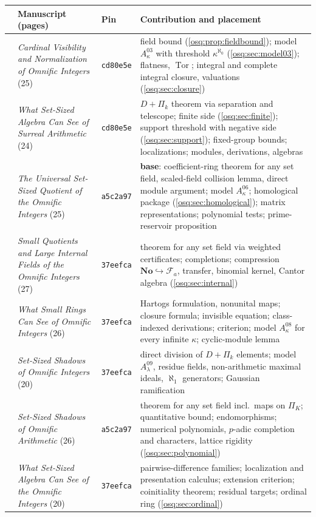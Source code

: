 \documentclass[11pt,letterpaper]{article}
\numberwithin{equation}{section}
\theoremstyle{definition}
\theoremstyle{remark}
\theoremstyle{plain}
\newcommand{\No}{\mathbf{No}}
\newcommand{\FF}{\mathscr F}         %
\newcommand{\Tor}{\operatorname{Tor}}
\begin{document}
\begin{center}\small
\begin{tabular}{@{}>{\raggedright\arraybackslash}p{}>{\raggedright\arraybackslash}p{}>{\raggedright\arraybackslash}p{}>{\raggedright\arraybackslash}p{}@{}}
\toprule
& Manuscript (pages) & Pin & Contribution and placement\\
\midrule
03 & \emph{Cardinal Visibility and Normalization of Omnific Integers} (25) & \texttt{cd80e5e} & field bound (\cref{osq:prop:fieldbound}); model $A^{03}_\kappa$ with threshold $\kappa^{\aleph_0}$ (\cref{osq:sec:model03}); flatness, $\Tor$; integral and complete integral closure, valuations (\cref{osq:sec:closure})\\
04 & \emph{What Set-Sized Algebra Can See of Surreal Arithmetic} (24) & \texttt{cd80e5e} & $D+\Pi_k$ theorem via separation and telescope; finite side (\cref{osq:sec:finite}); support threshold with negative side (\cref{osq:sec:support}); fixed-group bounds; localizations; modules, derivations, algebras\\
06 & \emph{The Universal Set-Sized Quotient of the Omnific Integers} (25) & \texttt{a5c2a97} & \textbf{base}: coefficient-ring theorem for any set field, scaled-field collision lemma, direct module argument; model $A^{06}_\kappa$; homological package (\cref{osq:sec:homological}); matrix representations; polynomial tests; prime-reservoir proposition\\
07 & \emph{Small Quotients and Large Internal Fields of the Omnific Integers} (27) & \texttt{37eefca} & theorem for any set field via weighted certificates; completions; compression $\No\hookrightarrow\FF_a$, transfer, binomial kernel, Cantor algebra (\cref{osq:sec:internal})\\
08 & \emph{What Small Rings Can See of Omnific Integers} (26) & \texttt{37eefca} & Hartogs formulation, nonunital maps; closure formula; invisible equation; class-indexed derivations; criterion; model $A^{08}_\kappa$ for every infinite $\kappa$; cyclic-module lemma\\
09 & \emph{Set-Sized Shadows of Omnific Integers} (20) & \texttt{37eefca} & direct division of $D+\Pi_k$ elements; model $A^{09}_\lambda$, residue fields, non-arithmetic maximal ideals, $\aleph_1$ generators; Gaussian ramification\\
10 & \emph{Set-Sized Shadows of Omnific Arithmetic} (26) & \texttt{a5c2a97} & theorem for any set field incl.\ maps on $\Pi_K$; quantitative bound; endomorphisms; numerical polynomials, $p$-adic completion and characters, lattice rigidity (\cref{osq:sec:polynomial})\\
11 & \emph{What Set-Sized Algebra Can See of the Omnific Integers} (20) & \texttt{37eefca} & pairwise-difference families; localization and presentation calculus; extension criterion; coinitiality theorem; residual targets; ordinal ring (\cref{osq:sec:ordinal})\\
\bottomrule
\end{tabular}
\end{center}
\end{document}
